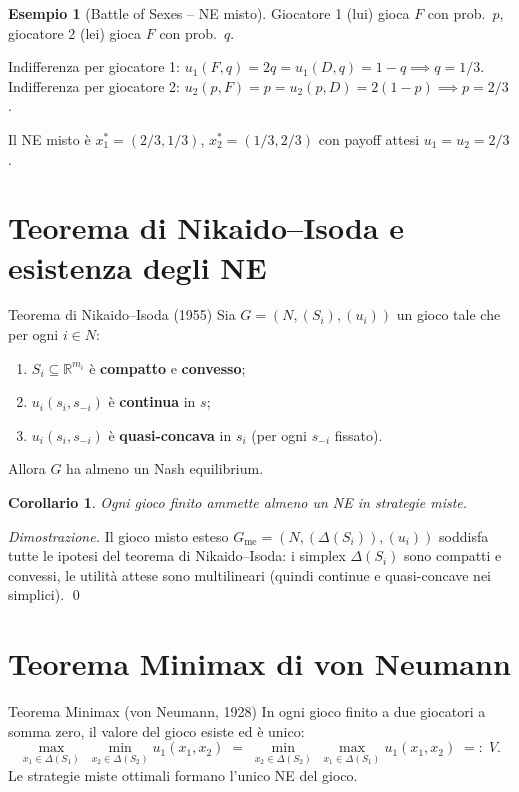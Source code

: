 \documentclass[12pt,a4paper,twoside]{book}
\theoremstyle{plain}
\newtheorem{corollary}[theorem]{Corollario}
\theoremstyle{definition}
\newtheorem{example}[theorem]{Esempio}
\begin{document}
\begin{example}[Battle of Sexes -- NE misto]
Giocatore 1 (lui) gioca $F$ con prob.\ $p$, giocatore 2 (lei) gioca $F$ con prob.\ $q$.

Indifferenza per giocatore 1: $u_1(F,q)=2q=u_1(D,q)=1-q \implies q=1/3$.
Indifferenza per giocatore 2: $u_2(p,F)=p=u_2(p,D)=2(1-p) \implies p=2/3$.

Il NE misto è $x^*_1=(2/3,1/3)$, $x^*_2=(1/3,2/3)$ con payoff attesi $u_1=u_2=2/3$.
\end{example}

\section{Teorema di Nikaido--Isoda e esistenza degli NE}

\begin{thmbox}{Teorema di Nikaido--Isoda (1955)}
Sia $G=(N,(S_i),(u_i))$ un gioco tale che per ogni $i\in N$:
\begin{enumerate}
  \item $S_i\subseteq\mathbb{R}^{m_i}$ è \textbf{compatto} e \textbf{convesso};
  \item $u_i(s_i,s_{-i})$ è \textbf{continua} in $s$;
  \item $u_i(s_i,s_{-i})$ è \textbf{quasi-concava} in $s_i$ (per ogni $s_{-i}$ fissato).
\end{enumerate}
Allora $G$ ha almeno un Nash equilibrium.
\end{thmbox}

\begin{corollary}
Ogni gioco finito ammette almeno un NE in strategie miste.
\end{corollary}
\textit{Dimostrazione.} Il gioco misto esteso $G_{\mathrm{me}}=(N,(\Delta(S_i)),(u_i))$ soddisfa tutte le ipotesi del teorema di Nikaido--Isoda: i simplex $\Delta(S_i)$ sono compatti e convessi, le utilità attese sono multilineari (quindi continue e quasi-concave nei simplici). \qed

\section{Teorema Minimax di von Neumann}

\begin{thmbox}{Teorema Minimax (von Neumann, 1928)}
In ogni gioco finito a due giocatori a somma zero, il valore del gioco esiste ed è unico:
\[
  \max_{x_1\in\Delta(S_1)}\; \min_{x_2\in\Delta(S_2)} u_1(x_1,x_2)
  \;=\;
  \min_{x_2\in\Delta(S_2)}\; \max_{x_1\in\Delta(S_1)} u_1(x_1,x_2)
  \;=:\; V.
\]
Le strategie miste ottimali formano l'unico NE del gioco.
\end{thmbox}
\end{document}
